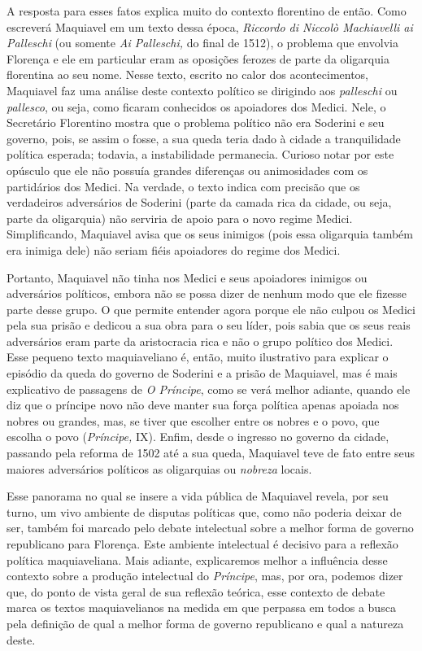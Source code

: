 A resposta para esses fatos explica muito do contexto florentino de
então. Como escreverá Maquiavel em um texto dessa época, \emph{Riccordo
di Niccolò Machiavelli ai Palleschi} (ou somente \emph{Ai Palleschi,} do
final de 1512), o problema que envolvia Florença e ele em particular
eram as oposições ferozes de parte da oligarquia florentina ao seu nome.
Nesse texto, escrito no calor dos acontecimentos, Maquiavel faz uma
análise deste contexto político se dirigindo aos \emph{palleschi} ou
\emph{pallesco}, ou seja, como ficaram conhecidos os apoiadores dos
Medici. Nele, o Secretário Florentino mostra que o problema político não
era Soderini e seu governo, pois, se assim o fosse, a sua queda teria
dado à cidade a tranquilidade política esperada; todavia, a
instabilidade permanecia. Curioso notar por este opúsculo que ele não
possuía grandes diferenças ou animosidades com os partidários dos
Medici. Na verdade, o texto indica com precisão que os verdadeiros
adversários de Soderini (parte da camada rica da cidade, ou seja, parte
da oligarquia) não serviria de apoio para o novo regime Medici.
Simplificando, Maquiavel avisa que os seus inimigos (pois essa
oligarquia também era inimiga dele) não seriam fiéis apoiadores do
regime dos Medici.

Portanto, Maquiavel não tinha nos Medici e seus apoiadores inimigos ou
adversários políticos, embora não se possa dizer de nenhum modo que ele
fizesse parte desse grupo. O que permite entender agora porque ele não
culpou os Medici pela sua prisão e dedicou a sua obra para o seu líder,
pois sabia que os seus reais adversários eram parte da aristocracia rica
e não o grupo político dos Medici. Esse pequeno texto maquiaveliano é,
então, muito ilustrativo para explicar o episódio da queda do governo de
Soderini e a prisão de Maquiavel, mas é mais explicativo de passagens de
\emph{O Príncipe}, como se verá melhor adiante, quando ele diz que o
príncipe novo não deve manter sua força política apenas apoiada nos
nobres ou grandes, mas, se tiver que escolher entre os nobres e o povo,
que escolha o povo (\emph{Príncipe,} IX). Enfim, desde o ingresso no
governo da cidade, passando pela reforma de 1502 até a sua queda,
Maquiavel teve de fato entre seus maiores adversários políticos as
oligarquias ou \emph{nobreza} locais.

Esse panorama no qual se insere a vida pública de Maquiavel revela, por
seu turno, um vivo ambiente de disputas políticas que, como não poderia
deixar de ser, também foi marcado pelo debate intelectual sobre a melhor
forma de governo republicano para Florença. Este ambiente intelectual é
decisivo para a reflexão política maquiaveliana. Mais adiante,
explicaremos melhor a influência desse contexto sobre a produção
intelectual do \emph{Príncipe}, mas, por ora, podemos dizer que, do
ponto de vista geral de sua reflexão teórica, esse contexto de debate
marca os textos maquiavelianos na medida em que perpassa em todos a
busca pela definição de qual a melhor forma de governo republicano e
qual a natureza deste.

